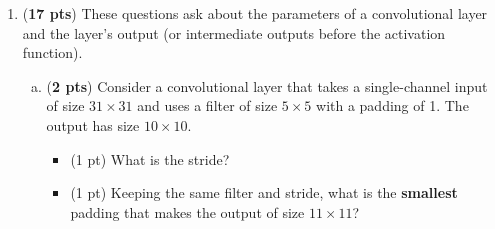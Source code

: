 \documentclass[11pt]{exam}
\begin{document}
\begin{enumerate}[1.]
\begin{enumerate}[(a)]
\newpage
\item ({\bf 4 pts})  Suppose you had an input feature map of size $12 \times 18$ (height $\times$ width) and a filter of size $4 \times 6$ (height $\times$ width), using a zero-padding of 2 and a stride of 3; what would be the resulting output size? Write your answer in terms of height $\times$ width. \\
{\bf Hint:} If $(N - K + 2P)/S$ is not an integer, round it down before adding 1, since the filter can only be placed where it fits completely inside the padded input. Describe your reasoning for earning partial credit.\\
\begin{tcolorbox}
\vspace{44ex}
\end{tcolorbox}
\end{enumerate}

\item ({\bf 17 pts}) These questions ask about the parameters of a convolutional layer and the layer's output (or intermediate outputs before the activation function).
    \begin{enumerate}[(a)]
        \item ({\bf 2 pts}) Consider a convolutional layer that takes a single-channel input of size $31\times31$ and uses a filter of size $5\times5$ with a padding of 1. The output has size $10 \times 10$.

        \begin{itemize}
            \item (1 pt) What is the stride?
            \item (1 pt) Keeping the same filter and stride, what is the \textbf{smallest} padding that makes the output of size $11 \times 11$?
        \end{itemize}
        
\begin{tcolorbox}
\vspace{30ex}
\end{tcolorbox}


\clearpage


\end{enumerate}
\end{enumerate}
\end{document}
